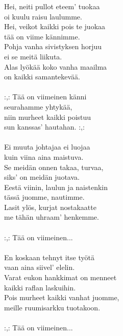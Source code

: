 
            Hei, neiti pullot eteem’ tuokaa \\
            oi kuulu raisu laulumme. \\
            Hei, veikot kaikki pois te juokaa \\
            tää on viime kännimme. \\
            Pohja vanha sivistyksen horjuu \\
            ei se meitä liikuta. \\
            Alas lyökää koko vanha maailma \\
            on kaikki samantekevää. \\
\hspace{10mm} \\
            :,: Tää on viimeinen känni \\
            seurahamme yhtykää, \\
            niin murheet kaikki poistuu \\
            sun kanssas’ hautahan. :,: \\
\hspace{10mm} \\
            Ei muuta johtajaa ei luojaa \\
            kuin viina aina maistuva. \\
            Se meidän onnen takaa, turvaa, \\
            siks’ on meidän juotava. \\
            Eestä viinin, laulun ja naistenkin \\
            tässä juomme, nautimme. \\
            Lasit ylös, kurjat nostakaatte \\
            me tähän uhraam’ henkemme. \\
\hspace{10mm} \\
            :,: Tää on viimeinen... \\
\hspace{10mm} \\
            En koskaan tehnyt itse työtä \\
            vaan aina siivel’ elelin. \\
            Varat eukon hankkimat on menneet \\
            kaikki raflan laskuihin. \\
            Pois murheet kaikki vanhat juomme, \\
            meille ruumisarkku tuotakoon. \\
\hspace{10mm} \\
            :,: Tää on viimeinen... \\

